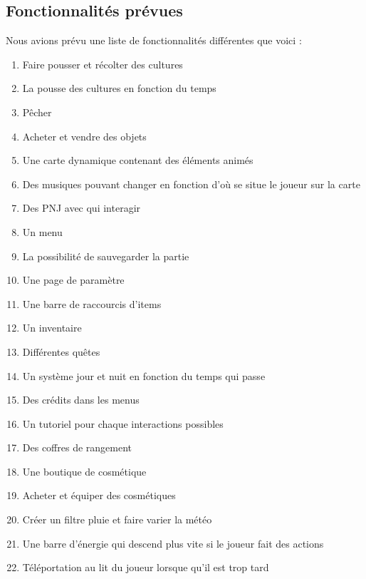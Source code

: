 \documentclass{article}
\begin{document}





\newpage
\subsection{Fonctionnalités prévues}

Nous avions prévu une liste de fonctionnalités différentes que voici : 
\begin{enumerate}
         \item Faire pousser et récolter des cultures
         \item La pousse des cultures en fonction du temps
         \item Pêcher
         \item Acheter et vendre des objets
         \item Une carte dynamique contenant des éléments animés
         \item Des musiques pouvant changer en fonction d'où se situe le joueur sur la carte
         \item Des PNJ avec qui interagir
         \item Un menu
         \item La possibilité de sauvegarder la partie
         \item Une page de paramètre
         \item Une barre de raccourcis d'items
         \item Un inventaire
         \item Différentes quêtes
         \item Un système jour et nuit en fonction du temps qui passe
         \item Des crédits dans les menus
         \item Un tutoriel pour chaque interactions possibles
         \item Des coffres de rangement
         \item Une boutique de cosmétique
         \item Acheter et équiper des cosmétiques
         \item Créer un filtre pluie et faire varier la météo
         \item Une barre d'énergie qui descend plus vite si le joueur fait des actions
         \item Téléportation au lit du joueur lorsque qu'il est trop tard\newline 
         
\end{enumerate}
\end{document}
